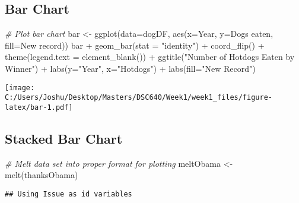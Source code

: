\documentclass[
]{article}
\newenvironment{Shaded}{\begin{snugshade}}{\end{snugshade}}
\newcommand{\AttributeTok}[1]{\textcolor[rgb]{0.77,0.63,0.00}{#1}}
\newcommand{\CommentTok}[1]{\textcolor[rgb]{0.56,0.35,0.01}{\textit{#1}}}
\newcommand{\FunctionTok}[1]{\textcolor[rgb]{0.00,0.00,0.00}{#1}}
\newcommand{\NormalTok}[1]{#1}
\newcommand{\OtherTok}[1]{\textcolor[rgb]{0.56,0.35,0.01}{#1}}
\newcommand{\SpecialCharTok}[1]{\textcolor[rgb]{0.00,0.00,0.00}{#1}}
\newcommand{\StringTok}[1]{\textcolor[rgb]{0.31,0.60,0.02}{#1}}
\begin{document}
\pagebreak

\hypertarget{bar-chart}{%
\subsection{Bar Chart}\label{bar-chart}}

\begin{Shaded}
\begin{Highlighting}[]
\CommentTok{\# Plot bar chart}
\NormalTok{bar }\OtherTok{\textless{}{-}} \FunctionTok{ggplot}\NormalTok{(}\AttributeTok{data=}\NormalTok{dogDF, }\FunctionTok{aes}\NormalTok{(}\AttributeTok{x=}\NormalTok{Year, }\AttributeTok{y=}\StringTok{\textasciigrave{}}\AttributeTok{Dogs eaten}\StringTok{\textasciigrave{}}\NormalTok{, }\AttributeTok{fill=}\StringTok{\textasciigrave{}}\AttributeTok{New record}\StringTok{\textasciigrave{}}\NormalTok{))}
\NormalTok{bar }\SpecialCharTok{+} \FunctionTok{geom\_bar}\NormalTok{(}\AttributeTok{stat =} \StringTok{"identity"}\NormalTok{) }\SpecialCharTok{+} \FunctionTok{coord\_flip}\NormalTok{() }\SpecialCharTok{+} 
  \FunctionTok{theme}\NormalTok{(}\AttributeTok{legend.text =} \FunctionTok{element\_blank}\NormalTok{()) }\SpecialCharTok{+} 
  \FunctionTok{ggtitle}\NormalTok{(}\StringTok{"Number of Hotdogs Eaten by Winner"}\NormalTok{) }\SpecialCharTok{+} 
  \FunctionTok{labs}\NormalTok{(}\AttributeTok{y=}\StringTok{"Year"}\NormalTok{, }\AttributeTok{x=}\StringTok{"Hotdogs"}\NormalTok{) }\SpecialCharTok{+} 
  \FunctionTok{labs}\NormalTok{(}\AttributeTok{fill=}\StringTok{"New Record"}\NormalTok{)}
\end{Highlighting}
\end{Shaded}

\texttt{[image: C:/Users/Joshu/Desktop/Masters/DSC640/Week1/week1\_files/figure-latex/bar-1.pdf]}
\pagebreak

\hypertarget{stacked-bar-chart}{%
\subsection{Stacked Bar Chart}\label{stacked-bar-chart}}

\begin{Shaded}
\begin{Highlighting}[]
\CommentTok{\# Melt data set into proper format for plotting}
\NormalTok{meltObama }\OtherTok{\textless{}{-}} \FunctionTok{melt}\NormalTok{(thanksObama)}
\end{Highlighting}
\end{Shaded}

\begin{verbatim}
## Using Issue as id variables
\end{verbatim}
\end{document}
